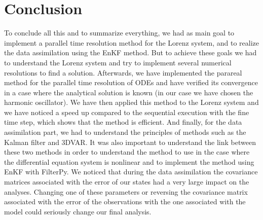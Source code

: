 \documentclass[12pt]{article}
\begin{document}
	\section{Conclusion}
	\noindent To conclude all this and to summarize everything, we had as main goal to implement a parallel time resolution method for the Lorenz system, and to realize the data assimilation using the EnKF method. But to achieve these goals we had to understand the Lorenz system and try to implement several numerical resolutions to find a solution. Afterwards, we have implemented the parareal method for the parallel time resolution of ODEs and have verified its convergence in a case where the analytical solution is known (in our case we have chosen the harmonic oscillator). We have then applied this method to the Lorenz system and we have noticed a speed up compared to the sequential execution with the fine time step, which shows that the method is efficient. And finally, for the data assimilation part, we had to understand the principles of methods such as the Kalman filter and 3DVAR. It was also important to understand the link between these two methods in order to understand the method to use in the case where the differential equation system is nonlinear and to implement the method using EnKF with FilterPy. We noticed that during the data assimilation the covariance matrices associated with the error of our states had a very large impact on the analyses. Changing one of these parameters or reversing the covariance matrix associated with the error of the observations with the one associated with the model could seriously change our final analysis. 
	
	\newpage
	
	\appendix
	
		
	
	\newpage	
	
	\printbibliography[keyword=ref,title={References}]
	
	\newpage
	
	\printbibliography[keyword=doc,title={Documentation}]
\end{document}

